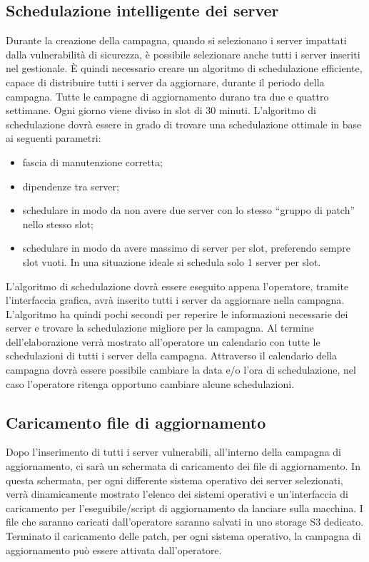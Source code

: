 \subsection{Schedulazione intelligente dei server}
Durante la creazione della campagna, quando si selezionano i server impattati 
dalla vulnerabilità di sicurezza, è possibile selezionare anche tutti i server
inseriti nel gestionale. 
È quindi necessario creare un algoritmo di schedulazione efficiente, capace di 
distribuire tutti i server da aggiornare, durante il periodo della campagna.
Tutte le campagne di aggiornamento durano tra due e quattro settimane. 
Ogni giorno viene diviso in slot di 30 minuti. L’algoritmo di schedulazione 
dovrà essere in grado di trovare una schedulazione ottimale in base ai 
seguenti parametri:
\begin{itemize}
\item fascia di manutenzione corretta;
\item dipendenze tra server;
\item schedulare in modo da non avere due server con lo stesso 
“gruppo di patch” nello stesso slot;
\item schedulare in modo da avere massimo di server per slot, preferendo 
sempre slot vuoti. In una situazione ideale si schedula solo 1 server per slot.
\end{itemize}
L’algoritmo di schedulazione dovrà essere eseguito appena l’operatore, tramite 
l’interfaccia grafica, avrà inserito tutti i server da aggiornare nella 
campagna. L’algoritmo ha quindi pochi secondi per reperire le informazioni 
necessarie dei server e trovare la schedulazione migliore per la campagna.
Al termine dell’elaborazione verrà mostrato all’operatore un calendario con
tutte le schedulazioni di tutti i server della campagna.
Attraverso il calendario della campagna dovrà essere possibile cambiare la 
data e/o l’ora di schedulazione, nel caso l’operatore ritenga opportuno
cambiare alcune schedulazioni.


\subsection{Caricamento file di aggiornamento}
Dopo l’inserimento di tutti i server vulnerabili, all'interno della campagna 
di aggiornamento, ci sarà un schermata di caricamento dei file di aggiornamento.
In questa schermata, per ogni differente sistema operativo dei server
selezionati, verrà dinamicamente mostrato l’elenco dei sistemi operativi
e un’interfaccia di caricamento per l’eseguibile/script di aggiornamento 
da lanciare sulla macchina.
I file che saranno caricati dall’operatore saranno salvati in uno storage 
S3 dedicato.
Terminato il caricamento delle patch, per ogni sistema operativo, la campagna 
di aggiornamento può essere attivata dall’operatore.


